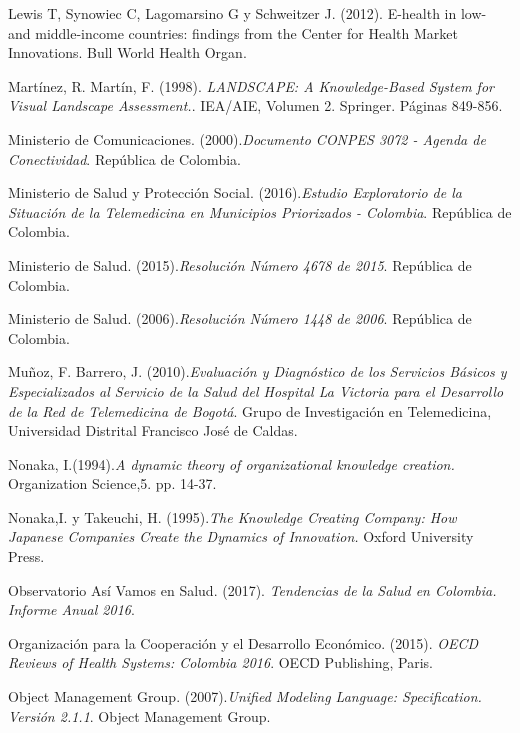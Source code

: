 \begin{thebibliography}{}
 Lewis T, Synowiec C, Lagomarsino G y Schweitzer J. (2012). E-health in low- and middle-income countries: findings from the Center for Health Market Innovations. Bull World Health Organ. 

 Martínez, R. Martín, F. (1998). \textit{LANDSCAPE: A Knowledge-Based System for Visual Landscape Assessment.}. IEA/AIE, Volumen 2. Springer. Páginas 849-856.

 Ministerio de Comunicaciones. (2000).\textit{Documento CONPES 3072 - Agenda de Conectividad}. República de Colombia.

 Ministerio de Salud y Protección Social. (2016).\textit{Estudio Exploratorio de la Situación de la Telemedicina en Municipios Priorizados - Colombia}. República de Colombia.

 Ministerio de Salud. (2015).\textit{Resolución Número 4678 de 2015}. República de Colombia.

 Ministerio de Salud. (2006).\textit{Resolución Número 1448 de 2006}. República de Colombia.

 Muñoz, F. Barrero, J. (2010).\textit{Evaluación y Diagnóstico de los Servicios Básicos y Especializados al Servicio de la Salud del Hospital La Victoria para el Desarrollo de la Red de Telemedicina de Bogotá}. Grupo de Investigación en Telemedicina,  Universidad Distrital Francisco José de Caldas.

 Nonaka, I.(1994).\textit{A dynamic theory of organizational knowledge creation.} Organization Science,5. pp. 14-37.

 Nonaka,I. y Takeuchi, H. (1995).\textit{The Knowledge Creating Company: How Japanese Companies Create the Dynamics of Innovation.} Oxford University Press.

 Observatorio Así Vamos en Salud. (2017). \textit{Tendencias de la Salud en Colombia. Informe Anual 2016}.

 Organización para la Cooperación y el Desarrollo Económico. (2015). \textit{OECD Reviews of Health Systems: Colombia 2016}. OECD Publishing, Paris.

 Object Management Group. (2007).\textit{Unified Modeling Language: Specification. Versión 2.1.1}. Object Management Group.


\end{thebibliography}
